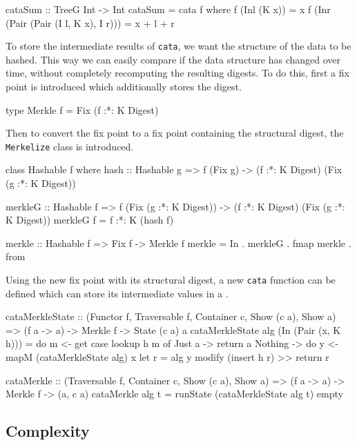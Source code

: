 \begin{haskell}
cataSum :: TreeG Int -> Int
cataSum = cata f
  where
    f (Inl (K x))                         = x
    f (Inr (Pair (Pair (I l, K x), I r))) = x + l + r
\end{haskell}

To store the intermediate results of \texttt{cata}, we want the structure of the data to be hashed. This way we can easily compare if the data structure has changed over time, without completely recomputing the resulting digests. To do this, first a fix point is introduced which additionally stores the digest.

\begin{haskell}
type Merkle f = Fix (f :*: K Digest)
\end{haskell}

Then to convert the fix point to a fix point containing the structural digest, the \texttt{Merkelize} class is introduced. 

\begin{haskell}
class Hashable f where
    hash :: Hashable g => f (Fix g) -> (f :*: K Digest) (Fix (g :*: K Digest))

merkleG :: Hashable f 
        => f (Fix (g :*: K Digest)) -> (f :*: K Digest) (Fix (g :*: K Digest))
merkleG f = f :*: K (hash f)

merkle :: Hashable f => Fix f -> Merkle f
merkle = In . merkleG . fmap merkle . from
\end{haskell}

Using the new fix point with its structural digest, a new \texttt{cata} function can be defined which can store its intermediate values in a . 

\begin{haskell}
cataMerkleState :: (Functor f, Traversable f, Container c, Show (c a), Show a)
                => (f a -> a) -> Merkle f -> State (c a) a
cataMerkleState alg (In (Pair (x, K h))) = do m <- get
  case lookup h m of
    Just a  -> return a
    Nothing -> do y <- mapM (cataMerkleState alg) x
               let r = alg y
               modify (insert h r) >> return r

cataMerkle :: (Traversable f, Container c, Show (c a), Show a)
           => (f a -> a) -> Merkle f -> (a, c a)
cataMerkle alg t = runState (cataMerkleState alg t) empty
\end{haskell}

\subsection{Complexity}

